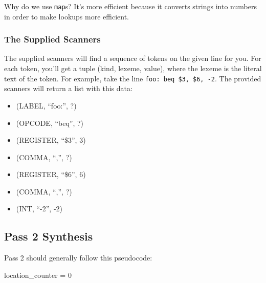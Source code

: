 \documentclass[]{article}
\theoremstyle{definition}
\begin{document}
					Why do we use \verb+map+s? It's more efficient because it converts strings into numbers in order to make lookups more efficient.

			\subsubsection{The Supplied Scanners}
			The supplied scanners will find a sequence of tokens on the given line for you. For each token, you'll get a tuple (kind, lexeme, value), where the lexeme is the literal text of the token. For example, take the line \verb+foo: beq $3, $6, -2+. The provided scanners will return a list with this data:
			\begin{itemize}
				\item (LABEL, ``foo:'', ?)
				\item (OPCODE, ``beq'', ?)
				\item (REGISTER, ``\$3'', 3)
				\item (COMMA, ``,'', ?)
				\item (REGISTER, ``\$6'', 6)
				\item (COMMA, ``,'', ?)
				\item (INT, ``-2'', -2)
			\end{itemize}
		\subsection{Pass 2 \textendash{} Synthesis}
			Pass 2 should generally follow this pseudocode:
			\begin{algorithm}
				location\_counter = 0\;
			\end{algorithm}
\end{document}
